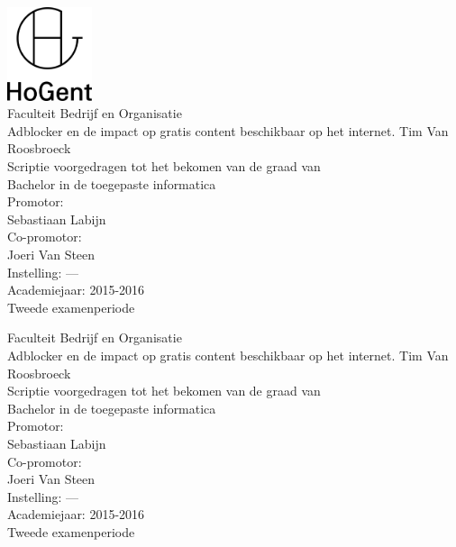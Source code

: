 \documentclass[pdftex,a4paper,12pt,twoside]{report}
\newcommand{\emptypage}{
\newpage
\thispagestyle{empty}
\mbox{}
\newpage
}
\newcommand{\student}{Tim Van Roosbroeck}
\newcommand{\promotor}{Sebastiaan Labijn}
\newcommand{\copromotor}{Joeri Van Steen}
\newcommand{\instelling}{---}
\newcommand{\titel}{Adblocker en de impact op gratis content beschikbaar op het internet.}
\newcommand{\faculteit}{Faculteit Bedrijf en Organisatie}
\newcommand{\rapporttype}{Scriptie voorgedragen tot het bekomen van de graad van\\Bachelor in de toegepaste informatica}
\newcommand{\academiejaar}{2015-2016}
\newcommand{\examenperiode}{Tweede examenperiode}
\begin{document}

\begin{titlepage}
  \begin{center}

    \begingroup
    \rmfamily
    \includegraphics[width=2.5cm]{img/HG-beeldmerk-woordmerk}\\[.5cm]
    \faculteit\\[3cm]
    \titel
    \vfill
    \student\\[3.5cm]
    \rapporttype\\[2cm]
    Promotor:\\
    \promotor\\
    Co-promotor:\\
    \copromotor\\[2.5cm]
    Instelling: \instelling\\[.5cm]
    Academiejaar: \academiejaar\\[.5cm]
    \examenperiode
    \endgroup

  \end{center}
  \restoregeometry
\end{titlepage}



\emptypage


\begin{titlepage}
  \begin{center}

    \begingroup
    \rmfamily
    \faculteit\\[3cm]
    \titel
    \vfill
    \student\\[3.5cm]
    \rapporttype\\[2cm]
    Promotor:\\
    \promotor\\
    Co-promotor:\\
    \copromotor\\[2.5cm]
    Instelling: \instelling\\[.5cm]
    Academiejaar: \academiejaar\\[.5cm]
    \examenperiode
    \endgroup

  \end{center}
  \restoregeometry
\end{titlepage}
\end{document}
